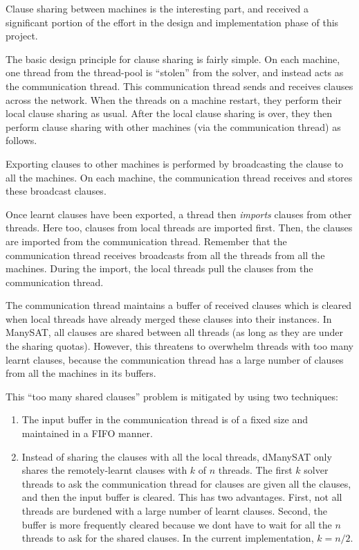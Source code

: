 \documentclass{article}
\begin{document}
Clause sharing between machines is the interesting part, and received
a significant portion of the effort in the design and implementation
phase of this project. 

The basic design principle for clause sharing is fairly simple. On
each machine, one thread from the thread-pool is ``stolen'' from the
solver, and instead acts as the communication thread. This
communication thread sends and receives clauses across the
network. When the threads on a machine restart, they perform their
local clause sharing as usual. After the local clause sharing is over,
they then perform clause sharing with other machines (via the
communication thread) as follows.


Exporting clauses to other machines is performed by broadcasting the
clause to all the machines. On each machine, the communication thread
receives and stores these broadcast clauses. 

Once learnt clauses have been exported, a thread then \emph{imports}
clauses from other threads. Here too, clauses from local threads are
imported first. Then, the clauses are imported from the communication
thread. Remember that the communication thread receives broadcasts
from all the threads from all the machines. During the import, the
local threads pull the clauses from the communication thread. 


The communication thread maintains a buffer of received clauses which
is cleared when local threads have already merged these clauses into
their instances. In ManySAT, all clauses are shared between all
threads (as long as they are under the sharing quotas). However, this
threatens to overwhelm threads with too many learnt clauses, because
the communication thread has a large number of clauses from all the
machines in its buffers. 

This ``too many shared clauses'' problem is mitigated by using two techniques:

\begin{enumerate}
\item The input buffer in the communication thread is of a fixed size and maintained in a FIFO manner.
\item Instead of sharing the clauses with all the local threads,
  dManySAT only shares the remotely-learnt clauses with $k$ of $n$
  threads. The first $k$ solver threads to ask the communication
  thread for clauses are given all the clauses, and then the input
  buffer is cleared. This has two advantages. First, not all threads
  are burdened with a large number of learnt clauses. Second, the
  buffer is more frequently cleared because we dont have to wait for
  all the $n$ threads to ask for the shared clauses. In the current
  implementation, $k=n/2$. 
\end{enumerate}
\end{document}
